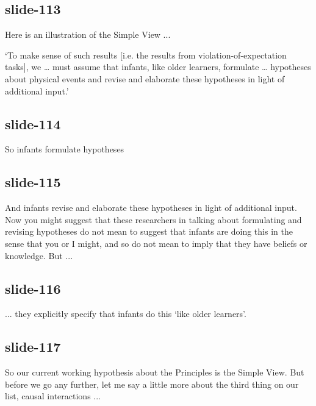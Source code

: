 \documentclass[12pt,\papersize]{extarticle}
\begin{document}
\subsection{slide-113}
Here is an illustration of the Simple View ...
 
‘To make sense of such results [i.e. the results from violation-of-expectation tasks], we … must assume that infants, like older learners, formulate … hypotheses about physical events and revise and elaborate these hypotheses in light of additional input.’
 
\subsection{slide-114}
So infants formulate hypotheses
 
\subsection{slide-115}
And infants revise and elaborate these hypotheses in light of additional input.
Now you might suggest that these researchers in talking about formulating and revising
hypotheses do not mean to suggest that infants are doing this in the sense that you or I 
might, and so do not mean to imply that they have beliefs or knowledge.  But ...
 
\subsection{slide-116}
... they explicitly specify that infants do this ‘like older learners’.
 
\subsection{slide-117}
So our current working hypothesis about the Principles is the Simple View.
But before we go any further, let me say a little more about the third thing on our list, 
causal interactions ...
 
\end{document}
